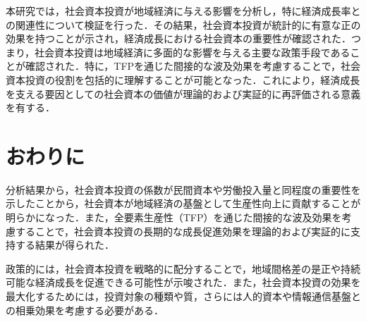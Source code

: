 \documentclass[a4paper, 10.5pt, twocolumn, dvipdfmx]{jarticle}
\begin{document}
本研究では，社会資本投資が地域経済に与える影響を分析し，特に経済成長率との関連性について検証を行った．その結果，社会資本投資が統計的に有意な正の効果を持つことが示され，経済成長における社会資本の重要性が確認された．つまり，社会資本投資は地域経済に多面的な影響を与える主要な政策手段であることが確認された．特に，TFPを通じた間接的な波及効果を考慮することで，社会資本投資の役割を包括的に理解することが可能となった．これにより，経済成長を支える要因としての社会資本の価値が理論的および実証的に再評価される意義を有する．

\section{おわりに}
分析結果から，社会資本投資の係数が民間資本や労働投入量と同程度の重要性を示したことから，社会資本が地域経済の基盤として生産性向上に貢献することが明らかになった．また，全要素生産性（TFP）を通じた間接的な波及効果を考慮することで，社会資本投資の長期的な成長促進効果を理論的および実証的に支持する結果が得られた．

政策的には，社会資本投資を戦略的に配分することで，地域間格差の是正や持続可能な経済成長を促進できる可能性が示唆された．また，社会資本投資の効果を最大化するためには，投資対象の種類や質，さらには人的資本や情報通信基盤との相乗効果を考慮する必要がある．




\end{document}
